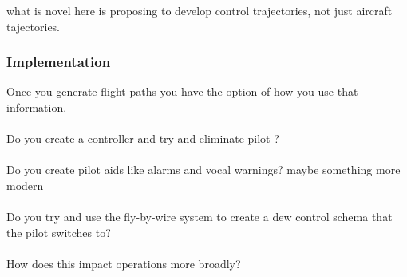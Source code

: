 what is novel here is proposing to develop control trajectories, not just aircraft tajectories. 

\subsubsection{Implementation} \label{ssec:controller}
Once you generate flight paths you have the option of how you use that information. \\
\\
Do you create a controller and try and eliminate pilot ?\\
\\
Do you create pilot aids like alarms and vocal warnings? maybe something more modern \\
\\
Do you try and use the fly-by-wire system to create a dew control schema that the pilot switches to?\\
\\
How does this impact operations more broadly?\\
\\


